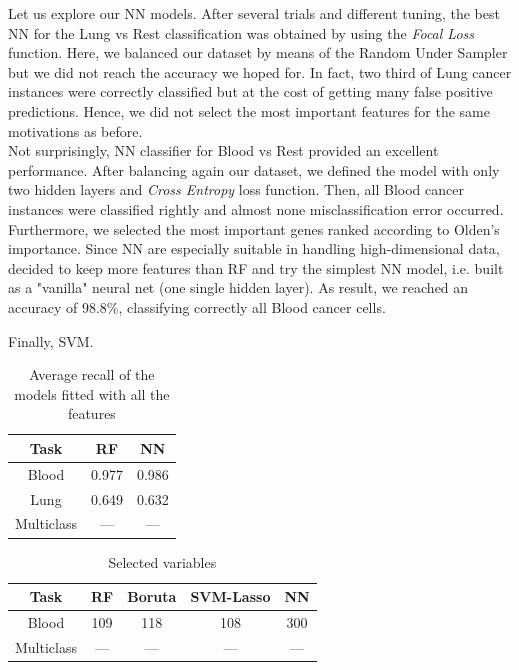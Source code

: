 \documentclass[a4paper,11pt, oneside]{article}  %
\begin{document}
Let us explore our NN models. After several trials and different tuning, the best NN for the Lung vs Rest classification was obtained by using the \textit{Focal Loss} function. Here, we balanced our dataset by means of the Random Under Sampler but we did not reach the accuracy we hoped for. In fact, two third of Lung cancer instances were correctly classified but at the cost of getting many false positive predictions. Hence, we did not select the most important features for the same motivations as before. \\
Not surprisingly, NN classifier for Blood vs Rest provided an excellent performance. After balancing again our dataset, we defined the model with only two hidden layers and \textit{Cross Entropy} loss function. Then, all Blood cancer instances were classified rightly and almost none misclassification error occurred. \\
Furthermore, we selected the most important genes ranked according to Olden's importance. Since NN are especially suitable in handling high-dimensional data, decided to keep more features than RF and try the simplest NN model, i.e. built as a "vanilla" neural net (one single hidden layer). As result, we reached an accuracy of $98.8\%$, classifying correctly all Blood cancer cells.



Finally, SVM.






\begin{table}[h!]
	\caption{Average recall of the models fitted with all the features}
	\centering
	\begin{tabular}{c c c}
		\hline\hline
		Task & RF & NN \\ [0.5ex] %
		\hline
		Blood & 0.977  & 0.986 \\
		Lung & 0.649  & 0.632 \\
		Multiclass & --- & --- \\ [1ex]
		\hline
	\end{tabular}
	\label{table:big_models}
\end{table}

\begin{table}[h!]
	\caption{Selected variables}
	\centering
	\begin{tabular}{c c c c c}
		\hline\hline
		Task & RF & Boruta & SVM-Lasso & NN \\ [0.5ex] %
		\hline
		Blood & 109 & 118 & 108 & 300 \\
		Multiclass & --- &  --- & --- & --- \\ [1ex]
		\hline
	\end{tabular}
	\label{table:selected variables}
\end{table}
\end{document}
